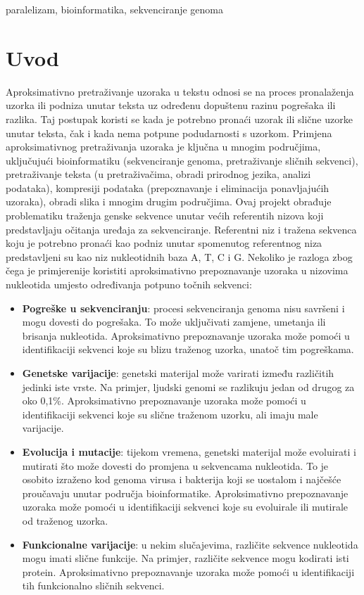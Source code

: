 \documentclass[conference]{IEEEtran}
\begin{document}
\begin{IEEEkeywords}
paralelizam, bioinformatika, sekvenciranje genoma
\end{IEEEkeywords}

\section{Uvod}
Aproksimativno pretraživanje uzoraka u tekstu odnosi se na proces pronalaženja uzorka ili podniza unutar teksta uz određenu dopuštenu razinu pogrešaka ili razlika. Taj postupak  koristi se kada je potrebno pronaći uzorak ili slične uzorke unutar teksta, čak i kada nema potpune podudarnosti s uzorkom. 
Primjena aproksimativnog pretraživanja uzoraka je ključna u mnogim područjima, uključujući bioinformatiku (sekvenciranje genoma, pretraživanje sličnih sekvenci), pretraživanje teksta (u pretraživačima, obradi prirodnog jezika, analizi podataka), kompresiji podataka (prepoznavanje i eliminacija ponavljajućih uzoraka), obradi slika i mnogim drugim područjima.  
Ovaj projekt obrađuje problematiku traženja genske sekvence unutar većih referentih nizova koji predstavljaju očitanja uređaja za sekvenciranje. Referentni niz i tražena sekvenca koju je potrebno pronaći kao podniz unutar spomenutog referentnog niza predstavljeni su kao niz nukleotidnih baza A, T, C i G. Nekoliko je razloga zbog čega je primjerenije koristiti aproksimativno prepoznavanje uzoraka u nizovima nukleotida umjesto određivanja potpuno točnih sekvenci:  
\begin{itemize}
\item \textbf{Pogreške u sekvenciranju}: procesi sekvenciranja genoma nisu savršeni i mogu dovesti do pogrešaka. To može uključivati zamjene, umetanja ili brisanja nukleotida. Aproksimativno prepoznavanje uzoraka može pomoći u identifikaciji sekvenci koje su blizu traženog uzorka, unatoč tim pogreškama. 
\item \textbf{Genetske varijacije}: genetski materijal može varirati između različitih jedinki iste vrste. Na primjer, ljudski genomi se razlikuju jedan od drugog za oko 0,1\%. Aproksimativno prepoznavanje uzoraka može pomoći u identifikaciji sekvenci koje su slične traženom uzorku, ali imaju male varijacije. 
\item \textbf{Evolucija i mutacije}: tijekom vremena, genetski materijal može evoluirati i mutirati što može dovesti do promjena u sekvencama nukleotida. To je osobito izraženo kod genoma virusa i bakterija koji se uostalom i najčešće proučavaju unutar područja bioinformatike. Aproksimativno prepoznavanje uzoraka može pomoći u identifikaciji sekvenci koje su evoluirale ili mutirale od traženog uzorka. 
\item \textbf{Funkcionalne varijacije}: u nekim slučajevima, različite sekvence nukleotida mogu imati slične funkcije. Na primjer, različite sekvence mogu kodirati isti protein. Aproksimativno prepoznavanje uzoraka može pomoći u identifikaciji tih funkcionalno sličnih sekvenci. 
\end{itemize}
\end{document}

